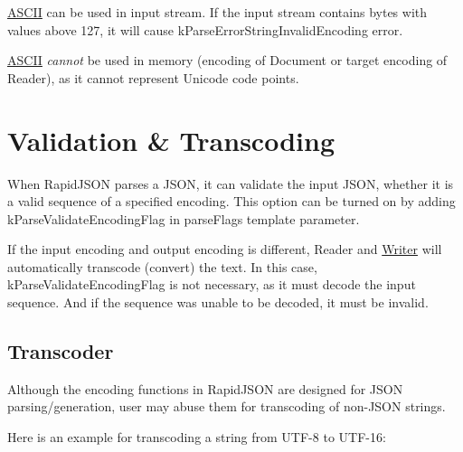 \hyperlink{struct_a_s_c_i_i}{A\+S\+C\+II} can be used in input stream. If the input stream contains bytes with values above 127, it will cause {\ttfamily k\+Parse\+Error\+String\+Invalid\+Encoding} error.

\hyperlink{struct_a_s_c_i_i}{A\+S\+C\+II} {\itshape cannot} be used in memory (encoding of {\ttfamily Document} or target encoding of {\ttfamily Reader}), as it cannot represent Unicode code points.\hypertarget{md_Commun_Externe_RapidJSON_doc_encoding.zh-cn_ValidationTranscoding}{}\section{Validation \& Transcoding}\label{md_Commun_Externe_RapidJSON_doc_encoding.zh-cn_ValidationTranscoding}
When Rapid\+J\+S\+ON parses a J\+S\+ON, it can validate the input J\+S\+ON, whether it is a valid sequence of a specified encoding. This option can be turned on by adding {\ttfamily k\+Parse\+Validate\+Encoding\+Flag} in {\ttfamily parse\+Flags} template parameter.

If the input encoding and output encoding is different, {\ttfamily Reader} and {\ttfamily \hyperlink{class_writer}{Writer}} will automatically transcode (convert) the text. In this case, {\ttfamily k\+Parse\+Validate\+Encoding\+Flag} is not necessary, as it must decode the input sequence. And if the sequence was unable to be decoded, it must be invalid.\hypertarget{md_Commun_Externe_RapidJSON_doc_encoding.zh-cn_Transcoder}{}\subsection{Transcoder}\label{md_Commun_Externe_RapidJSON_doc_encoding.zh-cn_Transcoder}
Although the encoding functions in Rapid\+J\+S\+ON are designed for J\+S\+ON parsing/generation, user may abuse them for transcoding of non-\/\+J\+S\+ON strings.

Here is an example for transcoding a string from U\+T\+F-\/8 to U\+T\+F-\/16\+:


